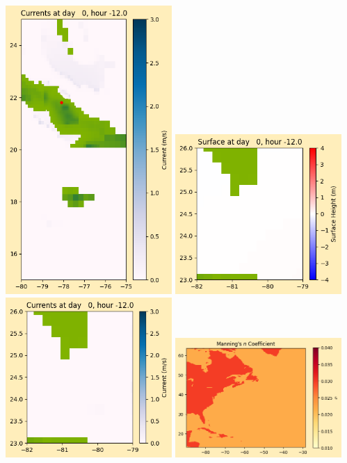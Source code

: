 \documentclass[11pt]{article}
\begin{document}
\includegraphics[width=0.475\textwidth]{frame0010fig1008.png}
\vskip 10pt 
\includegraphics[width=0.475\textwidth]{frame0010fig1009.png}
\includegraphics[width=0.475\textwidth]{frame0010fig1010.png}
\vskip 10pt 
\includegraphics[width=0.475\textwidth]{frame0010fig1011.png}
\end{document}
